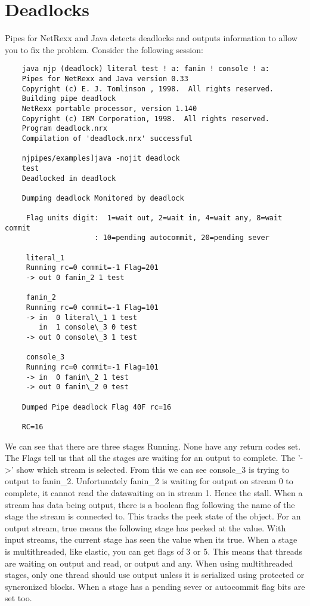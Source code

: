 \chapter{Deadlocks}
Pipes for NetRexx and Java detects deadlocks and outputs information to allow you to fix the problem.  Consider the following session:
\begin{verbatim}
    java njp (deadlock) literal test ! a: fanin ! console ! a:
    Pipes for NetRexx and Java version 0.33
    Copyright (c) E. J. Tomlinson , 1998.  All rights reserved.
    Building pipe deadlock
    NetRexx portable processor, version 1.140
    Copyright (c) IBM Corporation, 1998.  All rights reserved.
    Program deadlock.nrx
    Compilation of 'deadlock.nrx' successful

    njpipes/examples]java -nojit deadlock
    test
    Deadlocked in deadlock

    Dumping deadlock Monitored by deadlock

     Flag units digit:  1=wait out, 2=wait in, 4=wait any, 8=wait commit
                     : 10=pending autocommit, 20=pending sever

     literal_1
     Running rc=0 commit=-1 Flag=201
     -> out 0 fanin_2 1 test

     fanin_2
     Running rc=0 commit=-1 Flag=101
     -> in  0 literal\_1 1 test
        in  1 console\_3 0 test
     -> out 0 console\_3 1 test

     console_3
     Running rc=0 commit=-1 Flag=101
     -> in  0 fanin\_2 1 test
     -> out 0 fanin\_2 0 test

    Dumped Pipe deadlock Flag 40F rc=16

    RC=16
\end{verbatim}

We can see that there are three stages Running.  None have any return codes set.  The Flags tell us that all the stages are waiting for an output to complete.  The '->' show which stream is selected.  From this we can see console\_3 is trying to output to fanin\_2. Unfortunately fanin\_2 is waiting for output on stream 0 to complete, it cannot read the datawaiting on in stream 1.  Hence the stall.
When a stream has data being output, there is a boolean flag following the name of the stage the stream is connected to. This tracks the peek state of the object.  For an output stream, true means the following stage has peeked at the value. With input streams, the current stage has seen the value when its true.
When a stage is multithreaded, like elastic, you can get flags of 3 or 5. This means that threads are waiting on output and read, or output and any. When using multithreaded stages, only one thread should use output unless it is serialized using protected or syncronized blocks.
When a stage has a pending sever or autocommit flag bits are set too.

